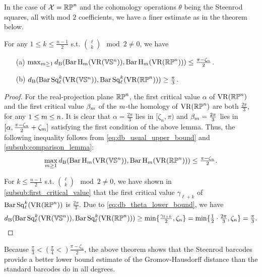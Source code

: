 In the case of $\mathcal{X} = \mathbb{RP}^n$ and the cohomology operations $\theta$ being the Steenrod squares, all with mod $2$ coefficients, we have a finer estimate as in the theorem below.

\medskip\theorem
For any $1\leq k \leq \frac{n-1}{2}$ s.t. $\binom{\ell}{k} \mod 2\neq 0$, we have
\begin{itemize} 
	\item[(a)] $\max_{m\geq 1}d_{\mathrm{B}}(\operatorname{Bar} \operatorname{H}_{m}(\operatorname{VR}(\mathbb{V}\mathbb{S}^n)), \operatorname{Bar} \operatorname{H}_{m}(\operatorname{VR}(\mathbb{RP}^n)))\leq \tfrac{\pi - \zeta_n}{2}$.
	\smallskip\item[(b)] $d_{\mathrm{B}}(\operatorname{Bar}\operatorname{Sq}^{k}_{\ell}(\operatorname{VR}(\mathbb{V}\mathbb{S}^n)), \operatorname{Bar}\operatorname{Sq}^{k}_{\ell}(\operatorname{VR}(\mathbb{RP}^n)))\geq \tfrac{\pi}{3}$.
\end{itemize}

\begin{proof}
        For the real-projection plane $\mathbb{RP}^n$, the first critical value $\alpha$ of $\operatorname{VR}(\mathbb{RP}^n)$ and the first critical value $\beta_m$ of the $m$-the homology of $\operatorname{VR}(\mathbb{RP}^n)$ are both $\tfrac{2\pi}{3}$, for any $1 \leq m \leq n$. %
        It is clear that $\alpha= \tfrac{2\pi}{3}$ lies in $[\zeta_n, \pi)$ and $\beta_m = \tfrac{2\pi}{3}$ lies in $[\alpha, \tfrac{\pi - \zeta_n}{2}+\zeta_m]$ satisfying the first condition of the above lemma. 
        Thus, the following inequality follows from \cref{eq:db_usual_upper_bound} and \cref{subsub:comparison_lemma}:
        \[\max_{m\geq 1}d_{\mathrm{B}}(\operatorname{Bar} \operatorname{H}_{m}(\operatorname{VR}(\mathbb{V}\mathbb{S}^n)), \operatorname{Bar} \operatorname{H}_{m}(\operatorname{VR}(\mathbb{RP}^n)))\leq \tfrac{\pi - \zeta_n}{2}.\]

        For $k \leq \frac{n-1}{2}$ s.t. $\binom{\ell}{k} \mod 2\neq 0$, we have shown in \cref{subsub:first_critical_value} that the first critical value $\gamma_{\ell+k}$ of $\operatorname{Bar}\operatorname{Sq}^{k}_{\ell}(\operatorname{VR}(\mathbb{RP}^n))$ is $\tfrac{2\pi}{3}$. 
        Due to \cref{eq:db_theta_lower_bound}, we have
        \[d_{\mathrm{B}}(\operatorname{Bar}\operatorname{Sq}^{k}_{\ell}(\operatorname{VR}(\mathbb{V}\mathbb{S}^n)), \operatorname{Bar}\operatorname{Sq}^{k}_{\ell}(\operatorname{VR}(\mathbb{RP}^n))) 
        \geq \min\{\tfrac{\gamma_{\ell+k}}{2}, \zeta_n\} 
        = \min\{\tfrac{1}{2}\cdot\tfrac{2\pi}{3}, \zeta_n\} 
        = \tfrac{\pi}{3}.\]
\end{proof}

Because $\tfrac{\pi}{3} < (\tfrac{\pi}{4} <) \tfrac{\pi - \zeta_n}{2}$, the above theorem shows that the Steenrod barcodes provide a better lower bound estimate of the Gromov-Hausdorff distance than the standard barcodes do in all degrees.
